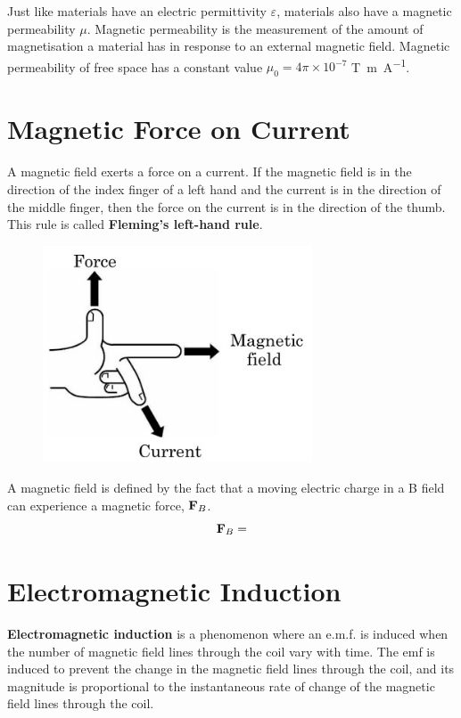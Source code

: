 Just like materials have an electric permittivity $\varepsilon$, materials also have a magnetic permeability $\mu$. Magnetic permeability is the measurement of the amount of magnetisation a material has in response to an external magnetic field. Magnetic permeability of free space has a constant value $\mu_0 = 4\pi \times 10^{-7}$ \unit{T.m.A^{-1}}.


\section{Magnetic Force on Current}
A magnetic field exerts a force on a current. If the magnetic field is in the direction of the index finger of a left hand and the current is in the direction of the middle finger, then the force on the current is in the direction of the thumb. This rule is called \textbf{Fleming’s left-hand rule}.

\begin{figure}[H]
    \centering
    \includegraphics[width=8cm]{images/fleming_lhr.jpg}
\end{figure}

A magnetic field is defined by the fact that a moving electric charge in a B field can experience a magnetic force, $\vb{F}_B$.
\begin{equation}
{\vb{F}_B = 
}\end{equation}

\section{Electromagnetic Induction}
\textbf{Electromagnetic induction} is a phenomenon where an e.m.f. is induced when the number of magnetic field lines through the coil vary with time. The emf is induced to prevent the change in the magnetic field lines through the coil, and its magnitude is proportional to the instantaneous rate of change of the magnetic field lines through the coil.

